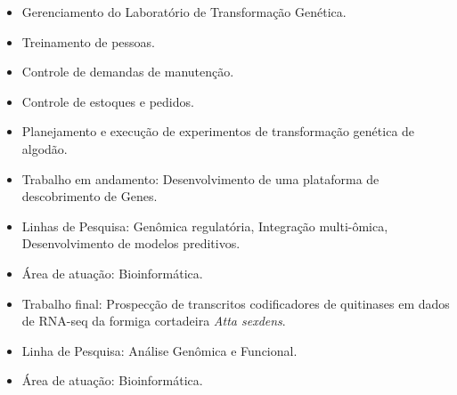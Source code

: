 \documentclass[10pt,a4paper,ragged2e]{altacv}
\begin{document}
\vspace{10px}

\begin{itemize}
    \item Gerenciamento do Laboratório de Transformação Genética.
    \item Treinamento de pessoas.
    \item Controle de demandas de manutenção.
    \item Controle de estoques e pedidos.
    \item Planejamento e execução de experimentos de transformação genética de algodão. \\
\end{itemize}

\vspace{10px}


\begin{itemize} 
    \item Trabalho em andamento: Desenvolvimento de uma plataforma de descobrimento de Genes.
    \item Linhas de Pesquisa: Genômica regulatória, Integração multi-ômica, Desenvolvimento de modelos preditivos.
    \item Área de atuação: Bioinformática. 
\end{itemize} 

\vspace{10px}

\begin{itemize} 
    \item Trabalho final: Prospecção de transcritos codificadores de quitinases em dados de RNA-seq da formiga cortadeira \textit{Atta sexdens}.
    \item Linha de Pesquisa: Análise Genômica e Funcional.
    \item Área de atuação: Bioinformática. 
\end{itemize} 

\clearpage
\end{document}
